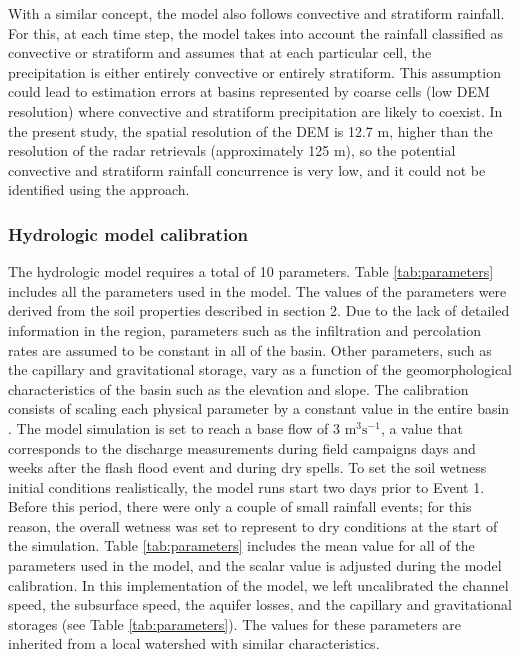 \documentclass[hess, manuscript]{copernicus}
\begin{document}
With a similar concept, the model also follows convective and stratiform rainfall. For this, at each time step, the model takes into account the rainfall classified as convective or stratiform and assumes that at each particular cell, the precipitation is either entirely convective or entirely stratiform. This assumption could lead to estimation errors at basins represented by coarse cells (low DEM resolution) where convective and stratiform precipitation are likely to coexist. In the present study, the spatial resolution of the DEM is 12.7 m, higher than the resolution of the radar retrievals (approximately 125 m), so the potential convective and stratiform rainfall concurrence is very low, and it could not be identified using the \cite{Steiner1995} approach.\\

\subsubsection{Hydrologic model calibration}

The hydrologic model requires a total of 10 parameters. Table \ref{tab:parameters} includes all the parameters used in the model. The values of the parameters were derived from the soil properties described in section 2. Due to the lack of detailed information in the region, parameters such as the infiltration and percolation rates are assumed to be constant in all of the basin. Other parameters, such as the capillary and gravitational storage, vary as a function of the geomorphological characteristics of the basin such as the elevation and slope. The calibration consists of scaling each physical parameter by a constant value in the entire basin \citep{Frances2007d}. The model simulation is set to reach a base flow of 3 m$^3 \text{s}^{-1}$, a value that corresponds to the discharge measurements during field campaigns days and weeks after the flash flood event and during dry spells.  To set the soil wetness initial conditions realistically, the model runs start two days prior to Event 1. Before this period, there were only a couple of small rainfall events; for this reason, the overall wetness was set to represent to dry conditions at the start of the simulation.  Table \ref{tab:parameters} includes the mean value for all of the parameters used in the model, and the scalar value is adjusted during the model calibration. In this implementation of the model, we left uncalibrated the channel speed, the subsurface speed, the aquifer losses, and the capillary and gravitational storages (see Table \ref{tab:parameters}). The values for these parameters are inherited from a local watershed with similar characteristics.
\end{document}
